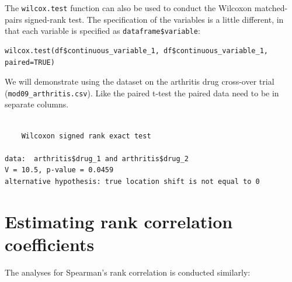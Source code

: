 \documentclass[
  a4paper,
]{memoir}
\newenvironment{Shaded}{\begin{snugshade}}{\end{snugshade}}
\newcommand{\AttributeTok}[1]{\textcolor[rgb]{0.00,0.00,0.00}{#1}}
\newcommand{\ConstantTok}[1]{\textcolor[rgb]{0.00,0.00,0.00}{#1}}
\newcommand{\FunctionTok}[1]{\textcolor[rgb]{0.00,0.00,0.00}{#1}}
\newcommand{\NormalTok}[1]{\textcolor[rgb]{0.00,0.00,0.00}{#1}}
\newcommand{\OtherTok}[1]{\textcolor[rgb]{0.00,0.00,0.00}{#1}}
\newcommand{\SpecialCharTok}[1]{\textcolor[rgb]{0.00,0.00,0.00}{#1}}
\newcommand{\StringTok}[1]{\textcolor[rgb]{0.00,0.00,0.00}{#1}}
\begin{document}
The \texttt{wilcox.test} function can also be used to conduct the
Wilcoxon matched-pairs signed-rank test. The specification of the
variables is a little different, in that each variable is specified as
\texttt{dataframe\$variable}:

\begin{verbatim}
wilcox.test(df$continuous_variable_1, df$continuous_variable_1, paired=TRUE)
\end{verbatim}

We will demonstrate using the dataset on the arthritis drug cross-over
trial (\texttt{mod09\_arthritis.csv}). Like the paired t-test the paired
data need to be in separate columns.

\begin{Shaded}
\end{Shaded}

\begin{verbatim}

    Wilcoxon signed rank exact test

data:  arthritis$drug_1 and arthritis$drug_2
V = 10.5, p-value = 0.0459
alternative hypothesis: true location shift is not equal to 0
\end{verbatim}

\section{Estimating rank correlation
coefficients}\label{estimating-rank-correlation-coefficients-1}

The analyses for Spearman's rank correlation is conducted similarly:

\begin{Shaded}
\end{Shaded}
\end{document}
